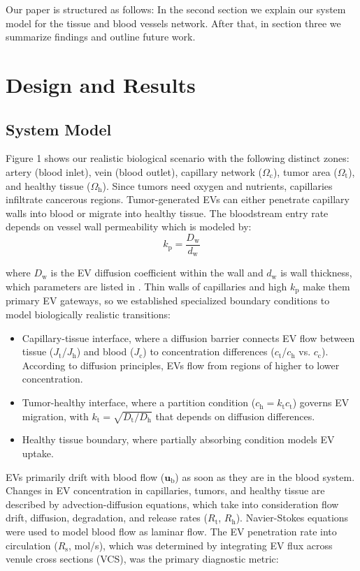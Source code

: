 \documentclass[sigconf]{acmart}
\begin{document}
Our paper is structured as follows: In the second section we explain our system model for the tissue and blood vessels network. After that, in section three we summarize findings and outline future work.

\section{Design and Results}
\label{sec: design-results}

\subsection{System Model}
\label{subsec: sys-model}
Figure 1 shows our realistic biological scenario with the following distinct zones: artery (blood inlet), vein (blood outlet), capillary network ($\Omega_{\text{c}}$), tumor area ($\Omega_{\text{t}}$), and healthy tissue ($\Omega_{\text{h}}$). Since tumors need oxygen and nutrients, capillaries infiltrate cancerous regions. Tumor-generated EVs can either penetrate capillary walls into blood or migrate into healthy tissue. The bloodstream entry rate depends on vessel wall permeability which is modeled by:
\begin{equation}
  k_{\mathrm{p}}=\frac{D_{\mathrm{w}}}{d_{\mathrm{w}}}
\end{equation}

where $D_{\mathrm{w}}$ is the EV diffusion coefficient within the wall and $d_{\mathrm{w}}$ is wall thickness, which parameters are listed in \cite{Zoofaghari_2023}. Thin walls of capillaries and high $k_{\mathrm{p}}$ make them primary EV gateways, so we established specialized boundary conditions to model biologically realistic transitions:
\begin{itemize}
  \item Capillary-tissue interface, where a diffusion barrier connects EV flow between tissue ($J_{\text{t}}$/$J_{\text{h}}$) and blood ($J_{\text{c}}$) to concentration differences ($c_{\text{t}}$/$c_{\text{h}}$ vs. $c_{\text{c}}$). According to diffusion principles, EVs flow from regions of higher to lower concentration.
  \item Tumor-healthy interface, where a partition condition ($c_{\text{h}} = k_{\text{t}}c_{\text{t}}$) governs EV migration, with $k_{\text{t}} = \sqrt{D_{\text{t}}/D_{\text{h}}}$ that depends on diffusion differences.
  \item Healthy tissue boundary, where partially absorbing condition models EV uptake.
\end{itemize}
EVs primarily drift with blood flow  ($\bm{u}_{\text{b}}$) as soon as they are in the blood system. Changes in EV concentration in capillaries, tumors, and healthy tissue are described by advection-diffusion equations, which take into consideration flow drift, diffusion, degradation, and release rates ($R_{\text{t}}$, $R_{\text{h}}$). Navier-Stokes equations were used to model blood flow as laminar flow. The EV penetration rate into circulation ($R_{\text{s}}$, mol/s), which was determined by integrating EV flux across venule cross sections (VCS), was the primary diagnostic metric:
\end{document}

